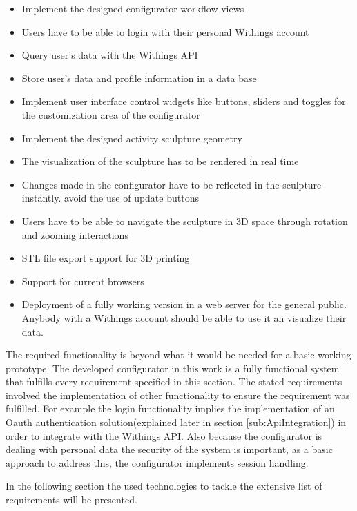 \documentclass[../medieninformatik-arbeit.tex]{subfiles}
\begin{document}
\begin{itemize}
	\item Implement the designed configurator workflow views
	\item Users have to be able to login with their personal Withings account
	\item Query user's data with the Withings API
	\item Store user's data and profile information in a data base
	\item Implement user interface control widgets like buttons, sliders and toggles for the customization area of the configurator
	\item Implement the designed activity sculpture geometry
	\item The visualization of the sculpture has to be rendered in real time  
	\item Changes made in the configurator have to be reflected in the sculpture instantly. avoid the use of update buttons 
	\item Users have to be able to navigate the sculpture in 3D space through rotation and zooming interactions
	\item STL file export support for 3D printing
	\item Support for current browsers
	\item Deployment of a fully working version in a web server for the general public. Anybody with a Withings account should be able to use it an visualize their data.
\end{itemize}


The required functionality is beyond what it would be needed for a basic working prototype. The developed configurator in this work is a fully functional system that fulfills every requirement specified in this section. The stated requirements involved the implementation of other functionality to ensure the requirement was fulfilled. For example the login functionality implies the implementation of an Oauth authentication solution(explained later in section \ref{sub:ApiIntegration}) in order to integrate with the Withings API. Also because the configurator is dealing with personal data the security of the system is important, as a basic approach to address this, the configurator implements session handling.

In the following section the used technologies to tackle the extensive list of requirements will be presented.  
\end{document}
